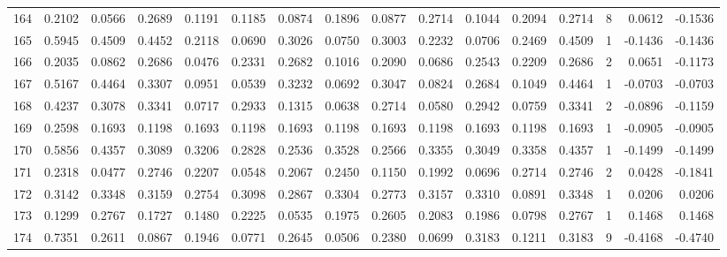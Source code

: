 \begin{tabular}{lrrrrrrrrrrrrrrr}
164 &      0.2102 &  0.0566 &  0.2689 &  0.1191 &  0.1185 &  0.0874 &  0.1896 &  0.0877 &  0.2714 &  0.1044 &   0.2094 &     0.2714 &      8 &                    0.0612 &                    -0.1536 \\
165 &      0.5945 &  0.4509 &  0.4452 &  0.2118 &  0.0690 &  0.3026 &  0.0750 &  0.3003 &  0.2232 &  0.0706 &   0.2469 &     0.4509 &      1 &                   -0.1436 &                    -0.1436 \\
166 &      0.2035 &  0.0862 &  0.2686 &  0.0476 &  0.2331 &  0.2682 &  0.1016 &  0.2090 &  0.0686 &  0.2543 &   0.2209 &     0.2686 &      2 &                    0.0651 &                    -0.1173 \\
167 &      0.5167 &  0.4464 &  0.3307 &  0.0951 &  0.0539 &  0.3232 &  0.0692 &  0.3047 &  0.0824 &  0.2684 &   0.1049 &     0.4464 &      1 &                   -0.0703 &                    -0.0703 \\
168 &      0.4237 &  0.3078 &  0.3341 &  0.0717 &  0.2933 &  0.1315 &  0.0638 &  0.2714 &  0.0580 &  0.2942 &   0.0759 &     0.3341 &      2 &                   -0.0896 &                    -0.1159 \\
169 &      0.2598 &  0.1693 &  0.1198 &  0.1693 &  0.1198 &  0.1693 &  0.1198 &  0.1693 &  0.1198 &  0.1693 &   0.1198 &     0.1693 &      1 &                   -0.0905 &                    -0.0905 \\
170 &      0.5856 &  0.4357 &  0.3089 &  0.3206 &  0.2828 &  0.2536 &  0.3528 &  0.2566 &  0.3355 &  0.3049 &   0.3358 &     0.4357 &      1 &                   -0.1499 &                    -0.1499 \\
171 &      0.2318 &  0.0477 &  0.2746 &  0.2207 &  0.0548 &  0.2067 &  0.2450 &  0.1150 &  0.1992 &  0.0696 &   0.2714 &     0.2746 &      2 &                    0.0428 &                    -0.1841 \\
172 &      0.3142 &  0.3348 &  0.3159 &  0.2754 &  0.3098 &  0.2867 &  0.3304 &  0.2773 &  0.3157 &  0.3310 &   0.0891 &     0.3348 &      1 &                    0.0206 &                     0.0206 \\
173 &      0.1299 &  0.2767 &  0.1727 &  0.1480 &  0.2225 &  0.0535 &  0.1975 &  0.2605 &  0.2083 &  0.1986 &   0.0798 &     0.2767 &      1 &                    0.1468 &                     0.1468 \\
174 &      0.7351 &  0.2611 &  0.0867 &  0.1946 &  0.0771 &  0.2645 &  0.0506 &  0.2380 &  0.0699 &  0.3183 &   0.1211 &     0.3183 &      9 &                   -0.4168 &                    -0.4740 \\

\end{tabular}
